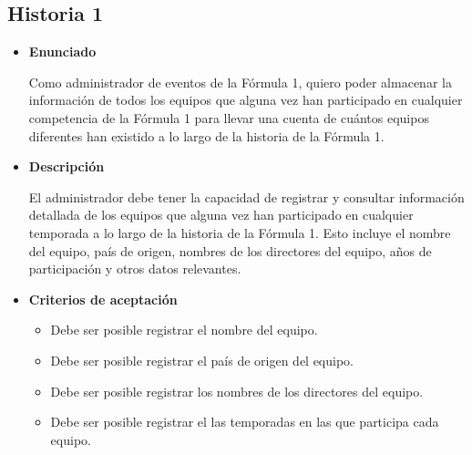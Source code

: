 \documentclass{article}
\begin{document}
	\subsection{Historia 1}
		\begin{itemize}
			
			\item \large{\textbf{Enunciado}}
			\begin{description}
				Como administrador de eventos de la Fórmula 1, quiero poder almacenar la información de todos los equipos que alguna vez han participado en cualquier competencia de la Fórmula 1 para llevar una cuenta de cuántos equipos diferentes han existido a lo largo de la historia de la Fórmula 1.
			\end{description}
			
			\item \large{\textbf{Descripción}}
			\begin{description}
				El administrador debe tener la capacidad de registrar y consultar información detallada de los equipos que alguna vez han participado en cualquier temporada a lo largo de la historia de la Fórmula 1. Esto incluye el nombre del equipo, país de origen, nombres de los directores del equipo, años de participación y otros datos relevantes.
				
			\end{description}
			
			\item \large{\textbf{Criterios de aceptación}}
			\begin{itemize}
				\item Debe ser posible registrar el nombre del equipo.
				\item Debe ser posible registrar el país de origen del equipo.
				\item Debe ser posible registrar los nombres de los directores del equipo. 
				\item Debe ser posible registrar el las temporadas en las que participa cada equipo.
			\end{itemize}
			
		\end{itemize}
	
\end{document}
